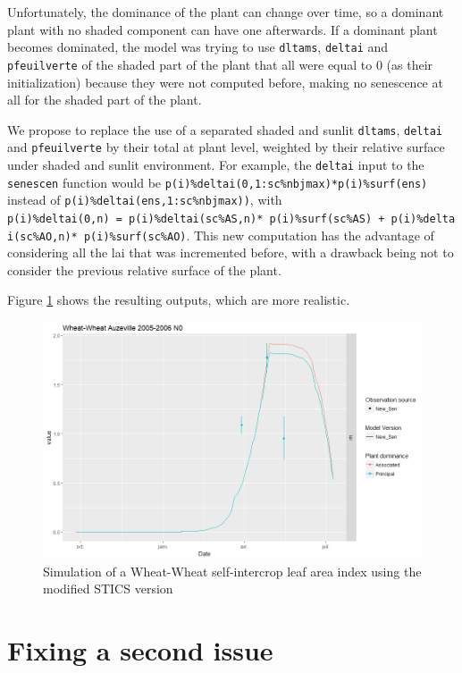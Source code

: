 \documentclass[
]{book}
\begin{document}
Unfortunately, the dominance of the plant can change over time, so a dominant plant with no shaded component can have one afterwards. If a dominant plant becomes dominated, the model was trying to use \texttt{dltams}, \texttt{deltai} and \texttt{pfeuilverte} of the shaded part of the plant that all were equal to 0 (as their initialization) because they were not computed before, making no senescence at all for the shaded part of the plant.

We propose to replace the use of a separated shaded and sunlit \texttt{dltams}, \texttt{deltai} and \texttt{pfeuilverte} by their total at plant level, weighted by their relative surface under shaded and sunlit environment. For example, the \texttt{deltai} input to the \texttt{senescen} function would be \texttt{p(i)\%deltai(0,1:sc\%nbjmax)*p(i)\%surf(ens)} instead of \texttt{p(i)\%deltai(ens,1:sc\%nbjmax))}, with \texttt{p(i)\%deltai(0,n)\ =\ p(i)\%deltai(sc\%AS,n)*\ p(i)\%surf(sc\%AS)\ +\ p(i)\%deltai(sc\%AO,n)*\ p(i)\%surf(sc\%AO)}. This new computation has the advantage of considering all the lai that was incremented before, with a drawback being not to consider the previous relative surface of the plant.

Figure \ref{fig:Newsen} shows the resulting outputs, which are more realistic.

\begin{figure}
\centering
\includegraphics{img/Newsen.png}
\caption{\label{fig:Newsen}Simulation of a Wheat-Wheat self-intercrop leaf area index using the modified STICS version}
\end{figure}

\hypertarget{fixing-a-second-issue}{%
\section{Fixing a second issue}\label{fixing-a-second-issue}}
\end{document}
